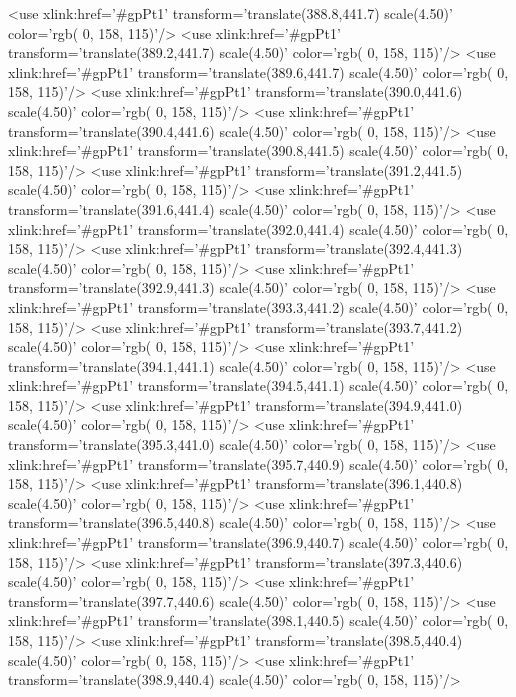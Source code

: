 	<use xlink:href='#gpPt1' transform='translate(388.8,441.7) scale(4.50)' color='rgb(  0, 158, 115)'/>
	<use xlink:href='#gpPt1' transform='translate(389.2,441.7) scale(4.50)' color='rgb(  0, 158, 115)'/>
	<use xlink:href='#gpPt1' transform='translate(389.6,441.7) scale(4.50)' color='rgb(  0, 158, 115)'/>
	<use xlink:href='#gpPt1' transform='translate(390.0,441.6) scale(4.50)' color='rgb(  0, 158, 115)'/>
	<use xlink:href='#gpPt1' transform='translate(390.4,441.6) scale(4.50)' color='rgb(  0, 158, 115)'/>
	<use xlink:href='#gpPt1' transform='translate(390.8,441.5) scale(4.50)' color='rgb(  0, 158, 115)'/>
	<use xlink:href='#gpPt1' transform='translate(391.2,441.5) scale(4.50)' color='rgb(  0, 158, 115)'/>
	<use xlink:href='#gpPt1' transform='translate(391.6,441.4) scale(4.50)' color='rgb(  0, 158, 115)'/>
	<use xlink:href='#gpPt1' transform='translate(392.0,441.4) scale(4.50)' color='rgb(  0, 158, 115)'/>
	<use xlink:href='#gpPt1' transform='translate(392.4,441.3) scale(4.50)' color='rgb(  0, 158, 115)'/>
	<use xlink:href='#gpPt1' transform='translate(392.9,441.3) scale(4.50)' color='rgb(  0, 158, 115)'/>
	<use xlink:href='#gpPt1' transform='translate(393.3,441.2) scale(4.50)' color='rgb(  0, 158, 115)'/>
	<use xlink:href='#gpPt1' transform='translate(393.7,441.2) scale(4.50)' color='rgb(  0, 158, 115)'/>
	<use xlink:href='#gpPt1' transform='translate(394.1,441.1) scale(4.50)' color='rgb(  0, 158, 115)'/>
	<use xlink:href='#gpPt1' transform='translate(394.5,441.1) scale(4.50)' color='rgb(  0, 158, 115)'/>
	<use xlink:href='#gpPt1' transform='translate(394.9,441.0) scale(4.50)' color='rgb(  0, 158, 115)'/>
	<use xlink:href='#gpPt1' transform='translate(395.3,441.0) scale(4.50)' color='rgb(  0, 158, 115)'/>
	<use xlink:href='#gpPt1' transform='translate(395.7,440.9) scale(4.50)' color='rgb(  0, 158, 115)'/>
	<use xlink:href='#gpPt1' transform='translate(396.1,440.8) scale(4.50)' color='rgb(  0, 158, 115)'/>
	<use xlink:href='#gpPt1' transform='translate(396.5,440.8) scale(4.50)' color='rgb(  0, 158, 115)'/>
	<use xlink:href='#gpPt1' transform='translate(396.9,440.7) scale(4.50)' color='rgb(  0, 158, 115)'/>
	<use xlink:href='#gpPt1' transform='translate(397.3,440.6) scale(4.50)' color='rgb(  0, 158, 115)'/>
	<use xlink:href='#gpPt1' transform='translate(397.7,440.6) scale(4.50)' color='rgb(  0, 158, 115)'/>
	<use xlink:href='#gpPt1' transform='translate(398.1,440.5) scale(4.50)' color='rgb(  0, 158, 115)'/>
	<use xlink:href='#gpPt1' transform='translate(398.5,440.4) scale(4.50)' color='rgb(  0, 158, 115)'/>
	<use xlink:href='#gpPt1' transform='translate(398.9,440.4) scale(4.50)' color='rgb(  0, 158, 115)'/>
